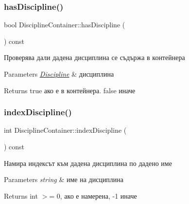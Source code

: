 \subsubsection{\texorpdfstring{has\+Discipline()}{hasDiscipline()}}
{\footnotesize\ttfamily bool Discipline\+Container\+::has\+Discipline (\begin{DoxyParamCaption}\item[{const \hyperlink{class_discipline}{Discipline} \&}]{ }\end{DoxyParamCaption}) const}



Проверява дали дадена дисциплина се съдържа в контейнера 


\begin{DoxyParams}{Parameters}
{\em \hyperlink{class_discipline}{Discipline}} & дисциплина \\
\hline
\end{DoxyParams}
\begin{DoxyReturn}{Returns}
true ако е в контейнера. false иначе 
\end{DoxyReturn}
\mbox{\label{class_discipline_container_addcd8466fa548162a6be57ea779a375b}} 
\subsubsection{\texorpdfstring{index\+Discipline()}{indexDiscipline()}}
{\footnotesize\ttfamily int Discipline\+Container\+::index\+Discipline (\begin{DoxyParamCaption}\item[{const std\+::string \&}]{ }\end{DoxyParamCaption}) const}



Намира индексът към дадена дисциплина по дадено име 


\begin{DoxyParams}{Parameters}
{\em string} & име на дисциплина \\
\hline
\end{DoxyParams}
\begin{DoxyReturn}{Returns}
int $>$= 0, ако е намерена, -\/1 иначе 
\end{DoxyReturn}
\mbox{\label{class_discipline_container_aba611613c69a52dc6aa84ca511140016}} 
